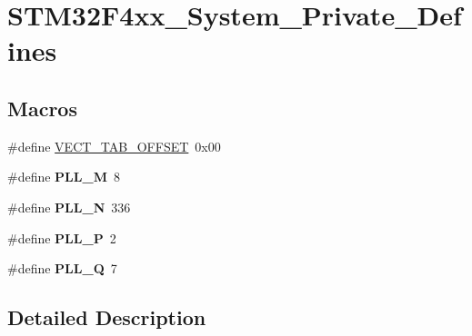 \hypertarget{group___s_t_m32_f4xx___system___private___defines}{\section{S\-T\-M32\-F4xx\-\_\-\-System\-\_\-\-Private\-\_\-\-Defines}
\label{group___s_t_m32_f4xx___system___private___defines}
}
\subsection*{Macros}
\begin{DoxyCompactItemize}
\item 
\#define \hyperlink{group___s_t_m32_f4xx___system___private___defines_ga40e1495541cbb4acbe3f1819bd87a9fe}{V\-E\-C\-T\-\_\-\-T\-A\-B\-\_\-\-O\-F\-F\-S\-E\-T}~0x00
\item 
\hypertarget{group___s_t_m32_f4xx___system___private___defines_ga0fa5a868f5cd056a04b1c42e454b9617}{\#define {\bfseries P\-L\-L\-\_\-\-M}~8}\label{group___s_t_m32_f4xx___system___private___defines_ga0fa5a868f5cd056a04b1c42e454b9617}

\item 
\hypertarget{group___s_t_m32_f4xx___system___private___defines_ga04586ea638d21afe558db4f2798c38a6}{\#define {\bfseries P\-L\-L\-\_\-\-N}~336}\label{group___s_t_m32_f4xx___system___private___defines_ga04586ea638d21afe558db4f2798c38a6}

\item 
\hypertarget{group___s_t_m32_f4xx___system___private___defines_ga290dcd27167e925d817e8334111c1c01}{\#define {\bfseries P\-L\-L\-\_\-\-P}~2}\label{group___s_t_m32_f4xx___system___private___defines_ga290dcd27167e925d817e8334111c1c01}

\item 
\hypertarget{group___s_t_m32_f4xx___system___private___defines_gac958257ddb2537c539cffdb3a4543067}{\#define {\bfseries P\-L\-L\-\_\-\-Q}~7}\label{group___s_t_m32_f4xx___system___private___defines_gac958257ddb2537c539cffdb3a4543067}

\end{DoxyCompactItemize}


\subsection{Detailed Description}


